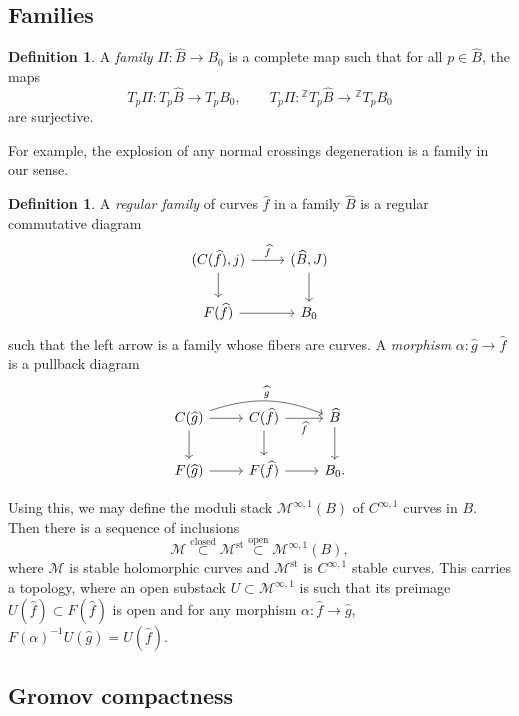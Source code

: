 \documentclass[leqno, openany]{memoir}
\theoremstyle{definition}
\newtheorem{defn}[thm]{Definition}
\theoremstyle{remark}
\theoremstyle{plain}
\theoremstyle{definition}
\theoremstyle{remark}
\newcommand{\Z}{\mathbb{Z}}
\newcommand{\mc}[1]{\mathcal{#1}}
\newcommand{\mr}[1]{\mathrm{#1}}
\newcommand{\wh}[1]{\widehat{#1}}
\begin{document}
\subsection{Families}
\label{subsec:families}

\begin{defn}
  A \textit{family} $\Pi \colon \wh{B} \to B_0$ is a complete map such that for all $p \in \wh{B}$, the maps
  \[ T_p \Pi \colon T_p \wh{B} \to T_p B_0, \qquad T_p \Pi \colon {}^{\Z}T_p \wh{B} \to {}^{\Z}T_p B_0 \]
  are surjective.
\end{defn}

For example, the explosion of any normal crossings degeneration is a family in our sense.

\begin{defn}
  A \textit{regular family} of curves $\wh{f}$ in a family $\wh{B}$ is a regular commutative diagram
  \begin{equation*}
    \begin{tikzcd}
      (C(\wh{f}), j) \ar{r}{\wh{f}} \ar{d} & (\wh{B}, J) \ar{d} \\
      F(\wh{f}) \ar{r} & B_0
    \end{tikzcd}
  \end{equation*}
  such that the left arrow is a family whose fibers are curves.
  A \textit{morphism} $\alpha \colon \wh{g} \to \wh{f}$ is a pullback diagram
  \begin{equation*}
    \begin{tikzcd}
      C(\wh{g}) \ar{d} \ar{r} \ar[bend left=20]{rr}{\wh{g}} & C(\wh{f}) \ar{d} \ar[swap]{r}{\wh{f}} & \wh{B} \ar{d} \\
      F(\wh{g}) \ar{r} & F(\wh{f}) \ar{r} & B_0.
    \end{tikzcd}
  \end{equation*}
\end{defn}

Using this, we may define the moduli stack $\mc{M}^{\infty, 1}(B)$ of $C^{\infty, 1}$ curves in $B$. Then there is a sequence of inclusions
\[ \mc{M} \overset{\text{closed}}{\subset} \mc{M}^{\mr{st}} \overset{\text{open}}{\subset} \mc{M}^{\infty, 1}(B), \]
where $\mc{M}$ is stable holomorphic curves and $\mc{M}^{\mr{st}}$ is $C^{\infty, 1}$ stable curves. This carries a topology, where an open substack $U \subset \mc{M}^{\infty, 1}$ is such that its preimage $U(\wh{f}) \subset F(\wh{f})$ is open and for any morphism $\alpha \colon \wh{f} \to \wh{g}$, $F(\alpha)^{-1} U(\wh{g}) = U(\wh{f})$.

\subsection{Gromov compactness}
\label{subsec:gromov_compactness}
\end{document}
